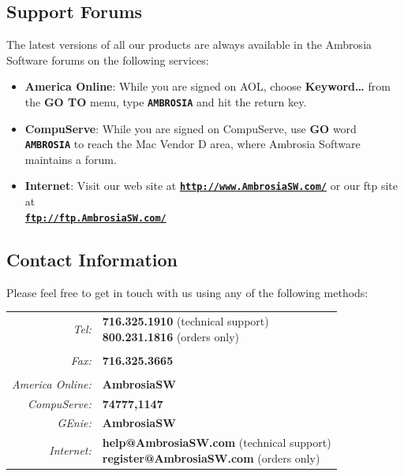 \documentclass{article}
\begin{document}
\subsection{Support Forums}
The latest versions of all our products are always available in the Ambrosia Software forums on the following services:

\begin{itemize}
	\item \textbf{America Online}: While you are signed on AOL, choose \textbf{Keyword\dots} from the \textbf{GO TO} menu, type \textbf{\texttt{AMBROSIA}} and hit the return key.
	\item \textbf{CompuServe}: While you are signed on CompuServe, use \textbf{GO} word \textbf{\texttt{AMBROSIA}} to reach the Mac Vendor D area, where Ambrosia Software maintains a forum.
	\item \textbf{Internet}: Visit our web site at \textbf{\href {https://web.archive.org/web/20190618111545/https://www.ambrosiasw.com/}{\texttt{http://www.AmbrosiaSW.com/}}} or our ftp site at\\
	\textbf{\href {https://web.archive.org/web/19990208202855/ftp://ftp.ambrosiasw.com/}{\texttt{ftp://ftp.AmbrosiaSW.com/}}}
\end{itemize}

\subsection{Contact Information}
Please feel free to get in touch with us using any of the following methods:


\addtolength{\leftskip}{-2cm}

\begin{tabular}{r l}
	\textit{Tel:} & \parbox[t]{\textwidth}{\textbf{716.325.1910} (technical support)\\ \textbf{800.231.1816} (orders only)}\\
	\\
	\textit{Fax:} & \textbf{716.325.3665}\\
	\\
	\textit{America Online:} & \textbf{AmbrosiaSW}\\
	\textit{CompuServe:} & \textbf{74777,1147}\\
	\textit{GEnie:} & \textbf{AmbrosiaSW}\\
	\textit{Internet:} & \parbox[t]{\textwidth}{\textbf{help@AmbrosiaSW.com} (technical support)\\ \textbf{register@AmbrosiaSW.com} (orders only)}
\end{tabular}
\end{document}
